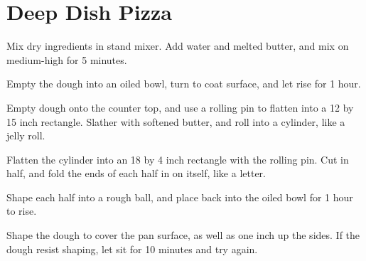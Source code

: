 

\section{Deep Dish Pizza}
\begin{recipe}



Mix dry ingredients in stand mixer. Add water and melted butter, and mix on medium-high for 5 minutes.

Empty the dough into an oiled bowl, turn to coat surface, and let rise for 1 hour.

Empty dough onto the counter top, and use a rolling pin to flatten into a 12 by 15 inch rectangle. Slather with softened butter, and roll into a cylinder, like a jelly roll.

Flatten the cylinder into an 18 by 4 inch rectangle with the rolling pin. Cut in half, and fold the ends of each half in on itself, like a letter.

Shape each half into a rough ball, and place back into the oiled bowl for 1 hour to rise.

Shape the dough to cover the pan surface, as well as one inch up the sides. If the dough resist shaping, let sit for 10 minutes and try again.



\end{recipe}
